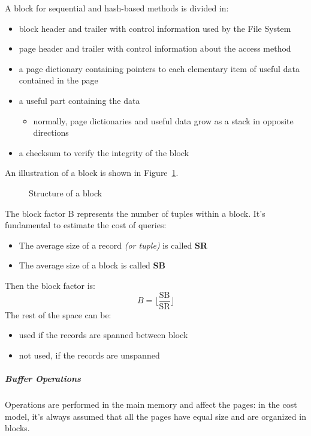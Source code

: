 \documentclass[english]{article}
\begin{document}
A block for sequential and hash-based methods is divided in:

\begin{itemize}
  \item block header and trailer with control information used by the File System
  \item page header and trailer with control information about the access method
  \item a page dictionary containing pointers to each elementary item of useful data contained in the page
  \item a useful part containing the data
        \begin{itemize}
          \item normally, page dictionaries and useful data grow as a stack in opposite directions
        \end{itemize}
  \item a checksum to verify the integrity of the block
\end{itemize}

An illustration of a block is shown in Figure~\ref{fig:block-structure}.

\begin{figure}[htbp]
  \centering
  \bigskip
  \caption{Structure of a block}
  \label{fig:block-structure}
  \bigskip
\end{figure}

\bigskip
The block factor B represents the number of tuples within a block.
It's fundamental to estimate the cost of queries:

\begin{itemize}
  \item The average size of a record \textit{(or tuple)} is called \textbf{SR}
  \item The average size of a block is called \textbf{SB}
\end{itemize}

Then the block factor is:
\[ B = \lfloor \frac{\text{SB}}{\text{SR}} \rfloor \]
The rest of the space can be:

\begin{itemize}
  \item used if the records are spanned between block
  \item not used, if the records are unspanned
\end{itemize}

\subparagraph*{Buffer Operations}

Operations are performed in the main memory and affect the pages: in the cost model, it's always assumed that all the pages have equal size and are organized in blocks.
\end{document}
